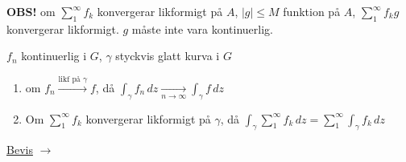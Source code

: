 \textcolor{red!70!black}{\textbf{OBS!}} om $\sum_1^\infty f_k$ konvergerar likformigt på $A$, $|g| \le M$ funktion på $A$, $\sum_1^\infty f_k g$ konvergerar likformigt. \textcolor{magenta!80!black}{$g$ måste inte vara kontinuerlig.}

\begin{theorem}[Proposition 7.27]
$f_n$ kontinuerlig i $G$, $\gamma$ styckvis glatt kurva i $G$
\begin{enumerate}[label=\alph*)]
  \item om $f_n \xrightarrow{\text{likf på } \gamma} f$, då $\displaystyle\int_\gamma f_n\,dz \xrightarrow[n \to \infty]{} \int_\gamma f\,dz$
  \item Om $\sum_1^\infty f_k$ konvergerar likformigt på $\gamma$, då $\displaystyle\int_\gamma \sum_1^\infty f_k\,dz = \sum_1^\infty \int_\gamma f_k\,dz$
\end{enumerate}
\end{theorem}

\hfill \textcolor{red!70!black}{\underline{Bevis}} $\longrightarrow$
